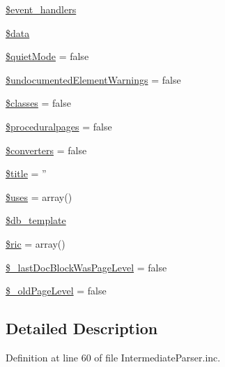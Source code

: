 \begin{DoxyCompactItemize}
\item 
\hyperlink{classphp_documentor___intermediate_parser_a43c58b8476d3252c39f474e1eb9169df}{\$event\-\_\-handlers}
\item 
\hyperlink{classphp_documentor___intermediate_parser_a6efc15b5a2314dd4b5aaa556a375c6d6}{\$data}
\item 
\hyperlink{classphp_documentor___intermediate_parser_a7b06630dd83a1912cca52476a5438f9e}{\$quiet\-Mode} = false
\item 
\hyperlink{classphp_documentor___intermediate_parser_aea3ee0e6b53ba278d457d0d8aafa952a}{\$undocumented\-Element\-Warnings} = false
\item 
\hyperlink{classphp_documentor___intermediate_parser_a4212f1eca3e4faf764728d56bc13dfd3}{\$classes} = false
\item 
\hyperlink{classphp_documentor___intermediate_parser_acc83daf92678ef7dde6bebc5560eb91e}{\$proceduralpages} = false
\item 
\hyperlink{classphp_documentor___intermediate_parser_a16c7db96cbf12e146fb962e69059975a}{\$converters} = false
\item 
\hyperlink{classphp_documentor___intermediate_parser_ada57e7bb7c152edad18fe2f166188691}{\$title} = ''
\item 
\hyperlink{classphp_documentor___intermediate_parser_af050f1d6cfed92e5511909eba5754516}{\$uses} = array()
\item 
\hyperlink{classphp_documentor___intermediate_parser_afcf109f9936f33068c9cda5404751d8a}{\$db\-\_\-template}
\item 
\hyperlink{classphp_documentor___intermediate_parser_a98207a9960bf351c0d6feea077664b4f}{\$ric} = array()
\item 
\hyperlink{classphp_documentor___intermediate_parser_a5ce561729506ba70ec45eb0eb5a52912}{\$\-\_\-last\-Doc\-Block\-Was\-Page\-Level} = false
\item 
\hyperlink{classphp_documentor___intermediate_parser_aa14373efd9d14ff22e99b91fbcf5e1a5}{\$\-\_\-old\-Page\-Level} = false
\end{DoxyCompactItemize}


\subsection{\-Detailed \-Description}


\-Definition at line 60 of file \-Intermediate\-Parser.\-inc.



